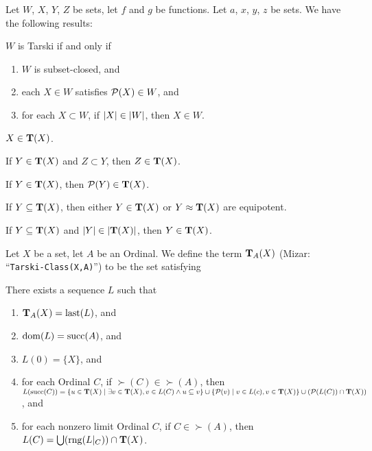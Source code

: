 \documentclass{article}
\begin{document}
Let $W$, $X$, $Y$, $Z$ be sets, let $f$ and $g$ be functions. Let $a$,
$x$, $y$, $z$ be sets.
We have the following results:
\begin{thm}
\item\label{classes1:1} $W$ is Tarski if and only if
\begin{enumerate}[label=(\roman*)]
\item $W$ is subset-closed, and
\item each $X\in W$ satisfies $\mathcal{P}(X)\in W$, and
\item for each $X\subset W$, if $|X|\in|W|$, then $X\in W$.
\end{enumerate}
\item\label{classes1:2} $X\in\TarskiClass{X}$.
\item\label{classes1:3} If $Y\in\TarskiClass{X}$ and $Z\subset Y$, then $Z\in\TarskiClass{X}$.
\item\label{classes1:4} If $Y\in\TarskiClass{X}$,
  then $\powerset(Y)\in\TarskiClass{X}$.
\item\label{classes1:5} If $Y\subset\TarskiClass{X}$,
  then either $Y\in\TarskiClass{X}$ or $Y\equipotent\TarskiClass{X}$ are equipotent.
\item\label{classes1:6} If $Y\subset\TarskiClass{X}$ and
  $\card{Y}\in\card{\TarskiClass{X}}$, then $Y\in\TarskiClass{X}$.
\end{thm}

\begin{definition}
Let $X$ be a set, let $A$ be an Ordinal.
We define the term $\TarskiClass[A]{X}$ (Mizar: ``\verb#Tarski-Class(X,A)#'')
to be the set satisfying
\begin{defn}
\item There exists a sequence $L$ such that
  \begin{enumerate}[label=(\roman*)]
  \item $\TarskiClass[A]{X}=\last(L)$, and
  \item $\operatorname{dom}(L)=\operatorname{succ}(A)$, and
  \item $L(0)=\{X\}$, and
  \item for each Ordinal $C$, if $\succ(C)\in\succ(A)$, then
    $L(\succ(C))=\{u\in\TarskiClass{X}\mid\exists v\in\TarskiClass{X},v\in L(C)\land u\subset v\}\cup\{\powerset(v)\mid v\in L(c), v\in\TarskiClass{X}\}\cup(\powerset(L(C))\cap\TarskiClass{X})$,
    and
  \item for each nonzero limit Ordinal $C$, if $C\in\succ(A)$,
    then $L(C)=\union(\rng(L|_{C}))\cap\TarskiClass{X}$.
  \end{enumerate}
\end{defn}
\end{definition}
\end{document}
